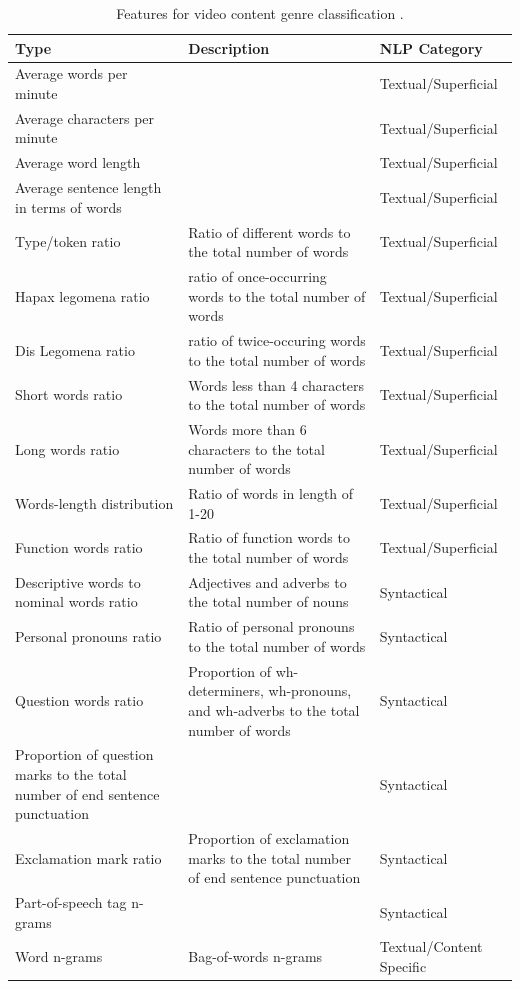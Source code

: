 \begin{table}[t]
	\center
	\caption {Features for video content genre classification  \parencite{lee2017text}.}\label{chap:relevant_work:tbl:videogenre_textbased_special_features}
	\begin{tabular}{p{4cm}p{7cm}p{3cm}}
		\hline
		Type & Description & NLP Category \\
		\hline
		Average words per minute & & Textual/Superficial  \\
        Average characters per minute & & Textual/Superficial  \\
        Average word length & & Textual/Superficial  \\
        Average sentence length in terms of words & & Textual/Superficial  \\
        Type/token ratio & Ratio of different words to the total number of words & Textual/Superficial  \\
        Hapax legomena ratio & ratio of once-occurring words to the total number of words  & Textual/Superficial  \\
        Dis Legomena ratio & ratio of twice-occuring words to the total number of words  & Textual/Superficial  \\
        Short words ratio & Words less than 4 characters to the total number of words & Textual/Superficial  \\
        Long words ratio & Words more than 6 characters to the total number of words & Textual/Superficial  \\
        Words-length distribution & Ratio of words in length of 1-20 & Textual/Superficial  \\
        Function words ratio & Ratio of function words to the total number of words  & Textual/Superficial  \\
        Descriptive words to nominal words ratio & Adjectives and adverbs to the total number of nouns & Syntactical \\
        Personal pronouns ratio & Ratio of personal pronouns to the total number of words & Syntactical \\
        Question words ratio & Proportion of wh-determiners, wh-pronouns, and wh-adverbs to the total number of words & Syntactical \\
        Proportion of question marks to the total number of end sentence punctuation & & Syntactical \\
        Exclamation mark ratio & Proportion of exclamation marks to the total number of end sentence punctuation & Syntactical \\
        Part-of-speech tag n-grams & & Syntactical \\
        Word n-grams & Bag-of-words n-grams  & Textual/Content Specific \\
  		\hline
	\end{tabular}
\end{table}

